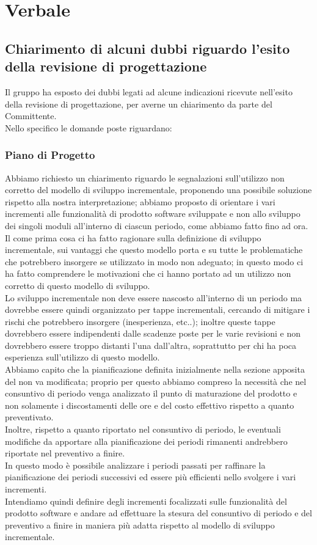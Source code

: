 \section{Verbale}
\subsection{Chiarimento di alcuni dubbi riguardo l'esito della revisione di progettazione}
Il gruppo ha esposto dei dubbi legati ad alcune indicazioni ricevute nell'esito della revisione di progettazione, per averne un chiarimento da parte del Committente. \\
Nello specifico le domande poste riguardano:

	\subsubsection*{Piano di Progetto}
	Abbiamo richiesto un chiarimento riguardo le segnalazioni sull'utilizzo non corretto del modello di sviluppo incrementale, proponendo una possibile soluzione rispetto alla nostra interpretazione; abbiamo proposto di orientare i vari incrementi alle funzionalità di prodotto software sviluppate e non allo sviluppo dei singoli moduli all'interno di ciascun periodo, come abbiamo fatto fino ad ora. \\
	Il \TV{} come prima cosa ci ha fatto ragionare sulla definizione di sviluppo incrementale, sui vantaggi che questo modello porta e su tutte le problematiche che potrebbero insorgere se utilizzato in modo non adeguato; in questo modo ci ha fatto comprendere le motivazioni che ci hanno portato ad un utilizzo non corretto di questo modello di sviluppo. \\
	Lo sviluppo incrementale non deve essere nascosto all'interno di un periodo ma dovrebbe essere quindi organizzato per tappe incrementali, cercando di mitigare i rischi che potrebbero insorgere (inesperienza, etc..); inoltre queste tappe dovrebbero essere indipendenti dalle scadenze poste per le varie revisioni e non dovrebbero essere troppo distanti l'una dall'altra, soprattutto per chi ha poca esperienza sull'utilizzo di questo modello. \\
	Abbiamo capito che la pianificazione definita inizialmente nella sezione apposita del \PdP{} non va modificata; proprio per questo abbiamo compreso la necessità che nel consuntivo di periodo venga analizzato il punto di maturazione del prodotto e non solamente i discostamenti delle ore e del costo effettivo rispetto a quanto preventivato. \\
	Inoltre, rispetto a quanto riportato nel consuntivo di periodo, le eventuali modifiche da apportare alla pianificazione dei periodi rimanenti andrebbero riportate nel preventivo a finire. \\
	In questo modo è possibile analizzare i periodi passati per raffinare la pianificazione dei periodi successivi ed essere più efficienti nello svolgere i vari incrementi. \\
	Intendiamo quindi definire degli incrementi focalizzati sulle funzionalità del prodotto software e andare ad effettuare la stesura del consuntivo di periodo e del preventivo a finire in maniera più adatta rispetto al modello di sviluppo incrementale.
	 
